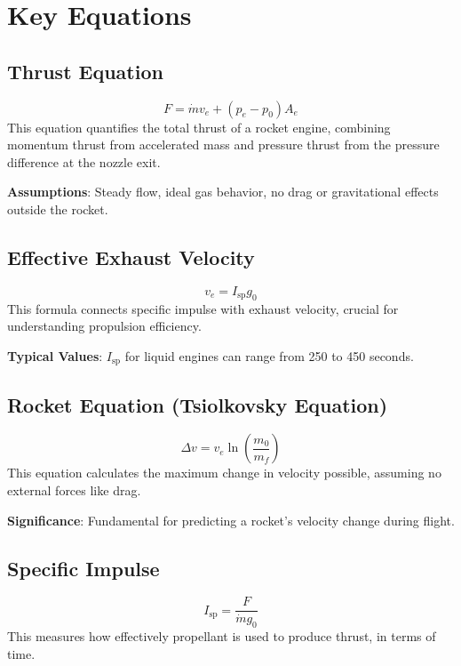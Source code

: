 \documentclass[12pt]{report}
\begin{document}
\section{Key Equations}

\subsection{Thrust Equation}
\begin{equation}
F = \dot{m} v_e + (p_e - p_0) A_e \label{eq:thrust}
\end{equation}
This equation quantifies the total thrust of a rocket engine, combining momentum thrust from accelerated mass and pressure thrust from the pressure difference at the nozzle exit. 

\textbf{Assumptions}: Steady flow, ideal gas behavior, no drag or gravitational effects outside the rocket.

\subsection{Effective Exhaust Velocity}
\begin{equation}
v_e = I_{\text{sp}} g_0 \label{eq:exhaust_velocity}
\end{equation}
This formula connects specific impulse with exhaust velocity, crucial for understanding propulsion efficiency.

\textbf{Typical Values}: $I_{\text{sp}}$ for liquid engines can range from 250 to 450 seconds.

\subsection{Rocket Equation (Tsiolkovsky Equation)}
\begin{equation}
\Delta v = v_e \ln\left(\frac{m_0}{m_f}\right) \label{eq:tsiolkovsky}
\end{equation}
This equation calculates the maximum change in velocity possible, assuming no external forces like drag.

\textbf{Significance}: Fundamental for predicting a rocket's velocity change during flight.

\subsection{Specific Impulse}
\begin{equation}
I_{\text{sp}} = \frac{F}{\dot{m} g_0} \label{eq:specific_impulse}
\end{equation}
This measures how effectively propellant is used to produce thrust, in terms of time.
\end{document}

